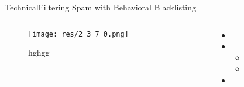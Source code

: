 \begin{frame}{Technical}{Filtering Spam with Behavioral Blacklisting \cite{ramachandran_filtering_2007}}

	\begin{columns}
		\begin{column}{0.5\textwidth}
			\begin{center}
			
				\begin{figure}
					\texttt{[image: res/2\_3\_7\_0.png]}
					\caption{\label{fig:2_3_7_0}hghgg}
				\end{figure}
				
			\end{center}
		\end{column}
		
		\begin{column}{0.5\textwidth}
		
			\begin{itemize}
				\item 
				
				\item 
					\begin{itemize}
						\item 
						\item 
					\end{itemize}
				
				\item 
			\end{itemize}
			
		\end{column}
	\end{columns}
	

\end{frame}

